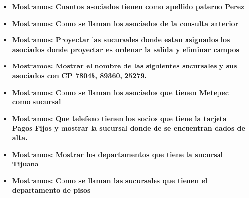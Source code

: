 \documentclass[12pt, fleqn]{article}                             %
\begin{document}
\begin{itemize}
        \item
            \textbf{Mostramos: Cuantos asociados tienen como apellido paterno Perez}
            

        \item
            \textbf{Mostramos: Como se llaman los asociados de la consulta anterior}
            




        \item
            \textbf{Mostramos: Proyectar las sucursales donde estan asignados
            los asociados donde proyectar es ordenar la salida y eliminar campos}
            

        \item
            \textbf{Mostramos: Mostrar el nombre de las siguientes sucursales y
            sus asociados con CP 78045, 89360, 25279.}
            

        \clearpage

        \item
            \textbf{Mostramos: Como se llaman los asociados que tienen Metepec como sucursal}
            

        \item
            \textbf{Mostramos: Que telefeno tienen los socios que tiene la 
            tarjeta Pagos Fijos y mostrar la sucursal donde de se encuentran
            dados de alta.}
            

        \item
            \textbf{Mostramos: Mostrar los departamentos que tiene la sucursal Tijuana}
            

        \item
            \textbf{Mostramos: Como se llaman las sucursales que tienen el departamento de pisos}
            

    \end{itemize}


    \clearpage
\end{document}
